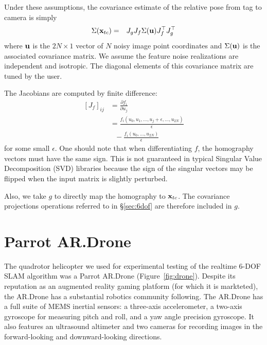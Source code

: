 \documentclass[conference]{IEEEtran}
\begin{document}
Under these assumptions, the covariance estimate of the relative pose from tag to camera
is simply
\begin{eqnarray*}
  \Sigma({{\bf x}_{tc}}) & = & J_g J_f \Sigma({\bf u}) J_f^\top J_g^\top
\end{eqnarray*}
where ${\bf u}$ is the $2N \times 1$ vector of $N$ noisy image point coordinates and
$\Sigma({\bf u})$ is the associated covariance matrix.  We assume the feature noise
realizations are independent and isotropic. The diagonal elements of this covariance
matrix are tuned by the user.

The Jacobians are computed by finite difference:
\begin{align*}
  \left[J_f\right]_{ij} &=\frac{\partial f_i}{\partial u_j} \\
  &= \frac{f_i(u_0, u_1, \dots, u_j +
    \epsilon, \dots, u_{2N})}{\epsilon} \\
  & \ \ \  - \frac{f_i(u_0, \dots, u_{2N})}{\epsilon}
\end{align*}
for some small $\epsilon$. One should note that when differentiating $f$, the homography
vectors must have the same sign.  This is not guaranteed in typical Singular Value
Decomposition (SVD) libraries because the sign of the singular vectors may be flipped when
the input matrix is slightly perturbed.

Also, we take $g$ to directly map the homography to ${\bf x}_{tc}$.  The covariance
projections operations referred to in \S\ref{sec:6dof} are therefore included in $g$.


\section{Parrot AR.Drone}
\label{sub:quadrotor}


The quadrotor helicopter we used for experimental testing of the realtime 6-\ac{DOF}
\ac{SLAM} algorithm was a Parrot AR.Drone (Figure~\ref{fig:drone}). Despite its reputation
as an augmented reality gaming platform (for which it is markteted), the AR.Drone has a
substantial robotics community following. The AR.Drone has a full suite of MEMS inertial
sensors: a three-axis accelerometer, a two-axis gyroscope for measuring pitch and roll,
and a yaw angle precision gyroscope.  It also features an ultrasound altimeter and two
cameras for recording images in the forward-looking and downward-looking directions.
\end{document}
